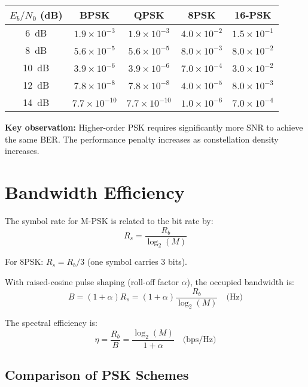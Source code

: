 \begin{center}
\begin{tabular}{@{}ccccc@{}}
\toprule
$E_b/N_0$ (dB) & BPSK & QPSK & 8PSK & 16-PSK \\
\midrule
6~dB & $1.9 \times 10^{-3}$ & $1.9 \times 10^{-3}$ & $4.0 \times 10^{-2}$ & $1.5 \times 10^{-1}$ \\
8~dB & $5.6 \times 10^{-5}$ & $5.6 \times 10^{-5}$ & $8.0 \times 10^{-3}$ & $8.0 \times 10^{-2}$ \\
10~dB & $3.9 \times 10^{-6}$ & $3.9 \times 10^{-6}$ & $7.0 \times 10^{-4}$ & $3.0 \times 10^{-2}$ \\
12~dB & $7.8 \times 10^{-8}$ & $7.8 \times 10^{-8}$ & $4.0 \times 10^{-5}$ & $8.0 \times 10^{-3}$ \\
14~dB & $7.7 \times 10^{-10}$ & $7.7 \times 10^{-10}$ & $1.0 \times 10^{-6}$ & $7.0 \times 10^{-4}$ \\
\bottomrule
\end{tabular}
\end{center}

\textbf{Key observation:} Higher-order PSK requires significantly more SNR to achieve the same BER. The performance penalty increases as constellation density increases.

\section{Bandwidth Efficiency}

The symbol rate for M-PSK is related to the bit rate by:
\begin{equation}
R_s = \frac{R_b}{\log_2(M)}
\end{equation}

For 8PSK: $R_s = R_b/3$ (one symbol carries 3 bits).

With raised-cosine pulse shaping (roll-off factor $\alpha$), the occupied bandwidth is:
\begin{equation}
B = (1 + \alpha)R_s = (1 + \alpha)\frac{R_b}{\log_2(M)} \quad \text{(Hz)}
\end{equation}

The spectral efficiency is:
\begin{equation}
\eta = \frac{R_b}{B} = \frac{\log_2(M)}{1 + \alpha} \quad \text{(bps/Hz)}
\end{equation}

\subsection{Comparison of PSK Schemes}

